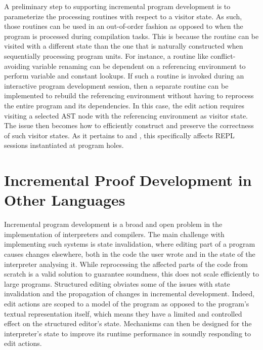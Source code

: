 A preliminary step to supporting incremental program development is to parameterize the processing routines with respect to a visitor state.
As such, those routines can be used in an out-of-order fashion as opposed to when the program is processed during compilation tasks.
This is because the routine can be visited with a different state than the one that is naturally constructed when sequentially processing program units.
For instance, a routine like conflict-avoiding variable renaming can be dependent on a referencing environment to perform variable and constant lookups.
If such a routine is invoked during an interactive program development session, then a separate routine can be implemented to rebuild the referencing environment without having to reprocess the entire program and its dependencies.
In this case, the edit action requires visiting a selected \ac{AST} node with the referencing environment as visitor state.
The issue then becomes how to efficiently construct and preserve the correctness of such visitor states.
As it pertains to \Beluga and \Harpoon, this specifically affects \ac{REPL} sessions instantiated at program holes.

\section{Incremental Proof Development in Other Languages}


Incremental program development is a broad and open problem in the implementation of interpreters and compilers.
The main challenge with implementing such systems is state invalidation, where editing part of a program causes changes elsewhere, both in the code the user wrote and in the state of the interpreter analysing it.
While reprocessing the affected parts of the code from scratch is a valid solution to guarantee soundness, this does not scale efficiently to large programs.
Structured editing obviates some of the issues with state invalidation and the propagation of changes in incremental development.
Indeed, edit actions are scoped to a model of the program as opposed to the program's textual representation itself, which means they have a limited and controlled effect on the structured editor's state.
Mechanisms can then be designed for the interpreter's state to improve its runtime performance in soundly responding to edit actions.

